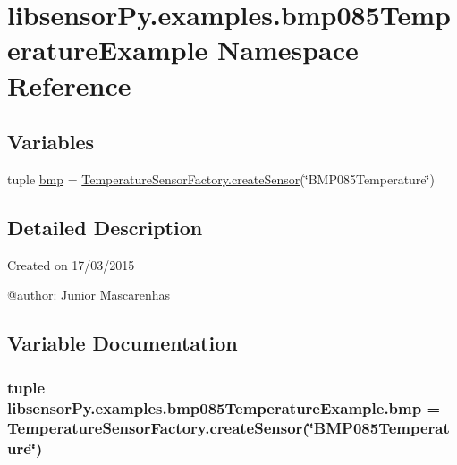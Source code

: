 \hypertarget{namespacelibsensorPy_1_1examples_1_1bmp085TemperatureExample}{}\section{libsensor\+Py.\+examples.\+bmp085\+Temperature\+Example Namespace Reference}
\label{namespacelibsensorPy_1_1examples_1_1bmp085TemperatureExample}
\subsection*{Variables}
\begin{DoxyCompactItemize}
\item 
tuple \hyperlink{namespacelibsensorPy_1_1examples_1_1bmp085TemperatureExample_a2b1b83a35a7eccec265cefc64f119f37}{bmp} = \hyperlink{classconcretefactory_1_1temperatureSensorFactory_1_1TemperatureSensorFactory_a10da40452b9fced7f217c6716e8d5ecc}{Temperature\+Sensor\+Factory.\+create\+Sensor}(\char`\"{}B\+M\+P085\+Temperature\char`\"{})
\end{DoxyCompactItemize}


\subsection{Detailed Description}
\begin{DoxyVerb}Created on 17/03/2015

@author: Junior Mascarenhas
\end{DoxyVerb}
 

\subsection{Variable Documentation}
\hypertarget{namespacelibsensorPy_1_1examples_1_1bmp085TemperatureExample_a2b1b83a35a7eccec265cefc64f119f37}{}
\subsubsection[{bmp}]{\setlength{\rightskip}{0pt plus 5cm}tuple libsensor\+Py.\+examples.\+bmp085\+Temperature\+Example.\+bmp = {\bf Temperature\+Sensor\+Factory.\+create\+Sensor}(\char`\"{}B\+M\+P085\+Temperature\char`\"{})}\label{namespacelibsensorPy_1_1examples_1_1bmp085TemperatureExample_a2b1b83a35a7eccec265cefc64f119f37}
